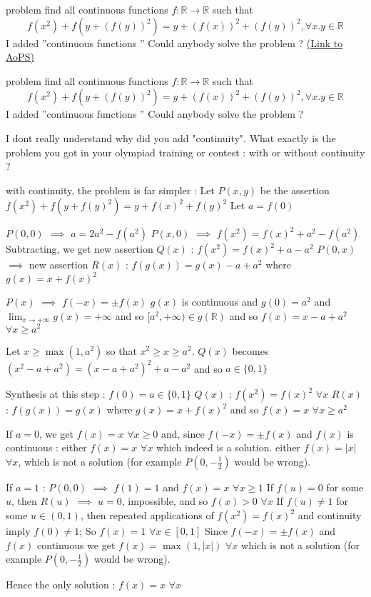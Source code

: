 \begin{problem}
	problem find all continuous functions $f:\mathbb{R}\to\mathbb{R}$ such that
\[f(x^2)+f(y+(f(y))^2)=y+(f(x))^2+(f(y))^2,\forall x.y\in\mathbb{R}\]
I added  ''continuous functions ''
Could anybody solve the problem ?
	\flushright \href{https://artofproblemsolving.com/community/c6h532369}{(Link to AoPS)}
\end{problem}



\begin{solution}
	\begin{tcolorbox}problem find all continuous functions $f:\mathbb{R}\to\mathbb{R}$ such that
\[f(x^2)+f(y+(f(y))^2)=y+(f(x))^2+(f(y))^2,\forall x.y\in\mathbb{R}\]
I added  ''continuous functions ''
Could anybody solve the problem ?\end{tcolorbox}
I dont really understand why did you add "continuity". What exactly is the problem you got in your olympiad training or contest : with or without continuity ?

with continuity, the problem is far simpler :
Let $P(x,y)$ be the assertion $f(x^2)+f(y+f(y)^2)=y+f(x)^2+f(y)^2$
Let $a=f(0)$

$P(0,0)$ $\implies$ $a=2a^2-f(a^2)$
$P(x,0)$ $\implies$ $f(x^2)=f(x)^2+a^2-f(a^2)$
Subtracting, we get new assertion $Q(x)$ : $f(x^2)=f(x)^2+a-a^2$
$P(0,x)$ $\implies$ new assertion $R(x)$ : $f(g(x))=g(x)-a+a^2$ where $g(x)=x+f(x)^2$

$P(x)$ $\implies$ $f(-x)=\pm f(x)$
$g(x)$ is continuous and $g(0)=a^2$ and $\lim_{x\to+\infty}g(x)=+\infty$ and so $[a^2,+\infty)\in g(\mathbb R)$ and so $f(x)=x-a+a^2$ $\forall x\ge a^2$

Let $x\ge\max(1,a^2)$ so that $x^2\ge x\ge a^2$. $Q(x)$ becomes $(x^2-a+a^2)=(x-a+a^2)^2+a-a^2$ and so $a\in\{0,1\}$

Synthesis at this step :
$f(0)=a\in\{0,1\}$
$Q(x)$ : $f(x^2)=f(x)^2$ $\forall x$
$R(x)$ : $f(g(x))=g(x)$ where $g(x)=x+f(x)^2$ and so $f(x)=x$ $\forall x\ge a^2$

If $a=0$, we get $f(x)=x$ $\forall x\ge 0$ and, since $f(-x)=\pm f(x)$ and $f(x)$ is continuous :
either $f(x)=x$ $\forall x$ which indeed is a solution.
either $f(x)=|x|$ $\forall x$, which is not a solution (for example $P(0,-\frac 12)$ would be wrong).

If $a=1$ :
$P(0,0)$ $\implies$ $f(1)=1$ and $f(x)=x$ $\forall x\ge 1$
If $f(u)=0$ for some $u$, then $R(u)$ $\implies$ $u=0$, impossible, and so $f(x)>0$ $\forall x$
If $f(u)\ne 1$ for some $u\in(0,1)$, then repeated applications of $f(x^2)=f(x)^2$ and continuity imply $f(0)\ne 1$;
So $f(x)=1$ $\forall x\in[0,1]$
Since $f(-x)=\pm f(x)$ and $f(x)$ continuous we get $f(x)=\max(1,|x|)$ $\forall x$ which is not a solution (for example $P(0,-\frac 12)$ would be wrong).

Hence the only solution : $\boxed{f(x)=x}$ $\forall x$
\end{solution}



